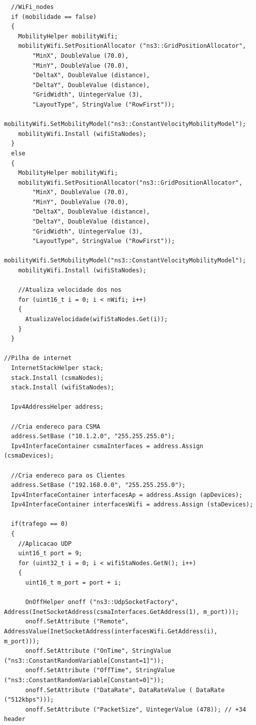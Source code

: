 \documentclass[12pt]{article}
\begin{document}
\begin{lstlisting}
  //WiFi_nodes
  if (mobilidade == false)
  { 
    MobilityHelper mobilityWifi;
    mobilityWifi.SetPositionAllocator ("ns3::GridPositionAllocator",
        "MinX", DoubleValue (70.0),
        "MinY", DoubleValue (70.0),
        "DeltaX", DoubleValue (distance),
        "DeltaY", DoubleValue (distance),
        "GridWidth", UintegerValue (3),
        "LayoutType", StringValue ("RowFirst"));
    mobilityWifi.SetMobilityModel("ns3::ConstantVelocityMobilityModel");
    mobilityWifi.Install (wifiStaNodes);
  }
  else
  {
    MobilityHelper mobilityWifi;
    mobilityWifi.SetPositionAllocator("ns3::GridPositionAllocator",
        "MinX", DoubleValue (70.0),
        "MinY", DoubleValue (70.0),
        "DeltaX", DoubleValue (distance),
        "DeltaY", DoubleValue (distance),
        "GridWidth", UintegerValue (3),
        "LayoutType", StringValue ("RowFirst")); 
    mobilityWifi.SetMobilityModel("ns3::ConstantVelocityMobilityModel");
    mobilityWifi.Install (wifiStaNodes);

    //Atualiza velocidade dos nos
    for (uint16_t i = 0; i < nWifi; i++)
    {
      AtualizaVelocidade(wifiStaNodes.Get(i));
    }
  }

//Pilha de internet
  InternetStackHelper stack;
  stack.Install (csmaNodes);
  stack.Install (wifiStaNodes);

  Ipv4AddressHelper address;

  //Cria endereco para CSMA
  address.SetBase ("10.1.2.0", "255.255.255.0");
  Ipv4InterfaceContainer csmaInterfaces = address.Assign (csmaDevices);

  //Cria endereco para os Clientes
  address.SetBase ("192.168.0.0", "255.255.255.0");
  Ipv4InterfaceContainer interfacesAp = address.Assign (apDevices);
  Ipv4InterfaceContainer interfacesWifi = address.Assign (staDevices);

  if(trafego == 0)
  {
    //Aplicacao UDP
    uint16_t port = 9;
    for (uint32_t i = 0; i < wifiStaNodes.GetN(); i++)
    {
      uint16_t m_port = port + i;

      OnOffHelper onoff ("ns3::UdpSocketFactory", Address(InetSocketAddress(csmaInterfaces.GetAddress(1), m_port)));
      onoff.SetAttribute ("Remote",  AddressValue(InetSocketAddress(interfacesWifi.GetAddress(i), m_port)));
      onoff.SetAttribute ("OnTime", StringValue ("ns3::ConstantRandomVariable[Constant=1]"));
      onoff.SetAttribute ("OffTime", StringValue ("ns3::ConstantRandomVariable[Constant=0]"));
      onoff.SetAttribute ("DataRate", DataRateValue ( DataRate ("512kbps")));
      onoff.SetAttribute ("PacketSize", UintegerValue (478)); // +34 header


\end{lstlisting}
\end{document}
